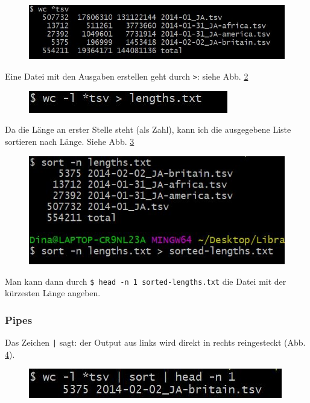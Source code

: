 \documentclass[11pt, a4paper, german]{article}
\begin{document}
\begin{figure}[h]
	\centering
	\includegraphics[width=0.7\linewidth]{bild1}
	\caption{}
	\label{fig:bild2}
\end{figure}

Eine Datei mit den Ausgaben erstellen geht durch \texttt{>}: siehe Abb. \ref{fig:bild3}

\begin{figure}[h]
	\centering
	\includegraphics[width=0.7\linewidth]{bild3}
	\caption{}
	\label{fig:bild3}
\end{figure}

Da die Länge an erster Stelle steht (als Zahl), kann ich die ausgegebene Liste sortieren nach Länge. Siehe Abb. \ref{fig:bild4}

\begin{figure}[h]
		\centering
	\includegraphics[width=0.7\linewidth]{bild4}
	\caption{}
	\label{fig:bild4}
\end{figure}

Man kann dann durch \texttt{\$ head -n 1 sorted-lengths.txt} die Datei mit der kürzesten Länge angeben. 

\subsubsection{Pipes}
Das Zeichen \texttt{|} sagt: der Output aus links wird direkt in rechts reingesteckt (Abb. \ref{fig:bild5}).

\begin{figure}[h]
	\centering
	\includegraphics[width=0.7\linewidth]{bild5}
	\caption{}
	\label{fig:bild5}
\end{figure}
\end{document}

